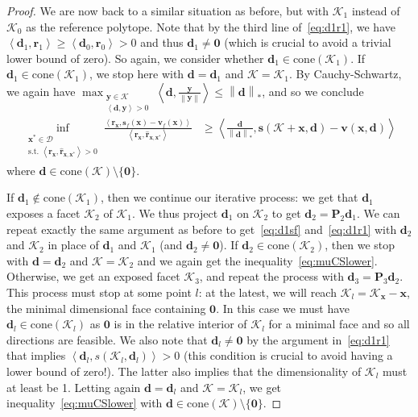 \documentclass{article} %
\providecommand{\norm}[1]{\left\lVert#1\right\rVert}
\newcommand{\domain}{\mathcal{D}}
\newcommand{\x}{\bm{x}}
\newcommand{\y}{\bm{y}}
\newcommand{\s}{\bm{s}}
\newcommand{\dd}{\bm{d}}
\newcommand{\vv}{\bm{v}} %
\renewcommand{\r}{\bm{r}}
\newcommand{\innerProd}[2]{\left\langle #1 , #2 \right\rangle}
\newcommand{\proj}{\bm{P}}
\newcommand{\Kface}{\mathcal{K}}
\newcommand{\0}{\mathbf{0}} %
\begin{document}
\begin{proof}
We are now back to a similar situation as before, but with $\Kface_1$ instead of $\Kface_0$ as the reference polytope. Note that by the third line of~\eqref{eq:d1r1}, we have $\innerProd{\dd_1}{\r_1} \geq \innerProd{\dd_0}{\r_0} > 0$ and thus $\dd_1 \neq \0$ (which is crucial to avoid a trivial lower bound of zero). So again, we consider whether $\dd_1 \in \text{cone}(\Kface_1)$. If $\dd_1 \in \text{cone}(\Kface_1)$, we stop here with $\dd = \dd_1$ and $\Kface = \Kface_1$. By Cauchy-Schwartz, we again have $\displaystyle 	\max_{\substack{\y \in \Kface \\ \innerProd{\dd}{\y} > 0}} \innerProd{\dd}{ \frac{\y}{\norm{\y}}} \leq \norm{\dd}_*$, and so we conclude
\begin{align} \label{eq:muCSlower}
	\inf_{\substack{\x^* \in \domain\\
               \textrm{s.t. } \innerProd{\r_{\x}}{ \hat{\r}_{\x,\x^*}} > 0}}
                       \frac{\innerProd{\r_{\x}}{ \s_f(\x) - \vv_f(\x)}}{\innerProd{\r_{\x}}{ \hat{\r}_{\x,\x^*}}} 
                       &\geq  \innerProd{\frac{\dd}{\norm{\dd}_*}}{\s(\Kface+\x, \dd) - \vv(\x, \dd)} 	
\end{align}
where $\dd \in \text{cone}(\Kface) \setminus \{\0\}$.

If $\dd_1 \notin \text{cone}(\Kface_1)$, then we continue our iterative process: we get that $\dd_1$ exposes a facet $\Kface_2$ of $\Kface_1$. We thus project $\dd_1$ on $\Kface_2$ to get $\dd_2 = \proj_2 \dd_1$. We can repeat exactly the same argument as before to get~\eqref{eq:d1sf} and~\eqref{eq:d1r1} with $\dd_2$ and $\Kface_2$ in place of $\dd_1$ and $\Kface_1$ (and $\dd_2 \neq \0$). If $\dd_2 \in \text{cone}(\Kface_2)$, then we stop with $\dd = \dd_2$ and $\Kface = \Kface_2$ and we again get the inequality~\eqref{eq:muCSlower}. Otherwise, we get an exposed facet $\Kface_3$, and repeat the process with $\dd_3 = \proj_3 \dd_2$. This process must stop at some point $l$: at the latest, we will reach $\Kface_l = \Kface_{\x}-\x$, the minimal dimensional face containing $\0$. In this case we must have $\dd_l \in \text{cone}(\Kface_l)$ as $\0$ is in the relative interior of $\Kface_l$ for a minimal face and so all directions are feasible.
We also note that $\dd_l \neq \0$ by the argument in~\eqref{eq:d1r1} that implies $\innerProd{\dd_l}{s(\Kface_l, \dd_l)} > 0$  (this condition is crucial to avoid having a lower bound of zero!). The latter also implies that the dimensionality of $\Kface_l$ must at least be 1. Letting again $\dd = \dd_l$ and $\Kface = \Kface_l$, we get inequality~\eqref{eq:muCSlower} with $\dd \in \text{cone}(\Kface) \setminus \{\0\}$.


\end{proof}
\end{document}
